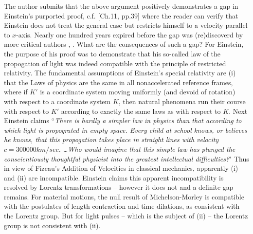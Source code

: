 \documentclass[12pt]{amsart}
\theoremstyle{definition}
\theoremstyle{remark}
\begin{document}
The author submits that the above argument positively demonstrates a gap in Einstein's purported proof, c.f. \cite{einstein2019relativity}[Ch.11, pp.39] where the reader can verify that Einstein does not treat the general case but restricts himself to a velocity parallel to $x$-axis. Nearly one hundred years expired before the gap was (re)discoverd by more critical authors \cite{bryant}, \cite{crothers}. What are the consequences of such a gap? For Einstein, the purpose of his proof was to demonstrate that his so-called law of the propogation of light was indeed compatible with the principle of restricted relativity. The fundamental assumptions of Einstein's special relativity are (i) that the Laws of physics are the same in all nonaccelerated reference frames, where if $K'$ is a coordinate system moving uniformly (and devoid of rotation) with respect to a coordinate system $K$, then natural phenomena run their course with respect to $K'$ according to exactly the same laws as with respect to $K$. Next Einstein claims ``\emph{There is hardly a simpler law in physics than that according to which light is propograted in empty space. Every child at school knows, or believes he knows, that this propogation takes place in straight lines with velocity $c=300 000 km/sec$. \ldots Who would imagine that this simple law has plunged the conscientiously thoughtful physicist into the greatest intellectual difficulties?}" Thus in view of Fizeau's Addition of Velocities in classical mechanics, apparently (i) and (ii) are incompatible. Einstein claims this apparent incompatibility is resolved by Lorentz transformations -- however it does not and a definite gap remains. For material motions, the null result of Michelson-Morley is compatible with the postulates of length contraction and time dilations, as consistent with the Lorentz group. But for light pulses -- which is the subject of (ii) -- the Lorentz group is not consistent with (ii).

\end{document}

